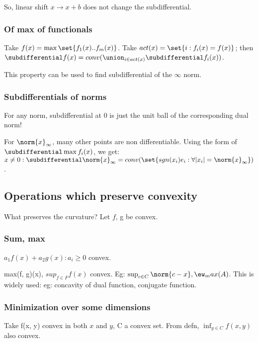 \documentclass[oneside, article]{memoir}
\begin{document}
So, linear shift $x \to x+b$ does not change the subdifferential.

\subsubsection{Of max of functionals}
Take $f(x) = \max \set{f_1(x) .. f_m(x)}$. Take $act(x) = \set{i: f_i(x) = f(x)}$; then $\subdifferential f(x) = conv(\union_{i \in act(x)} \subdifferential f_i(x))$.

This property can be used to find subdifferential of the $\infty$ norm.

\subsubsection{Subdifferentials of norms}
For any norm, subdifferential at 0 is just the unit ball of the corresponding dual norm!


For $\norm{x}_\infty$, many other points are non differentiable. Using the form of $\subdifferential \max f_i(x)$, we get: $x\neq 0: \subdifferential \norm{x}_\infty = conv(\set{sgn(x_i)e_i: \forall |x_i| = \norm{x}_\infty})$.

\subsection{Operations which preserve convexity}
What preserves the curvature? Let $f$, g be convex.

\subsubsection{Sum, max}
$a_1 f(x)+ a_2 g(x): a_i \geq 0$ convex.

max(f, g)(x), $sup_{f \in F}f(x)$  convex. Eg: $\sup_{c \in C} \norm{c-x}, \ew_max(A)$. This is widely used: eg: concavity of dual function, conjugate function.

\subsubsection{Minimization over some dimensions}
Take f(x, y) convex in both $x$ and $y$, C a convex set. From defn, $\inf_{y \in C} f(x, y)$ also convex.
\end{document}
